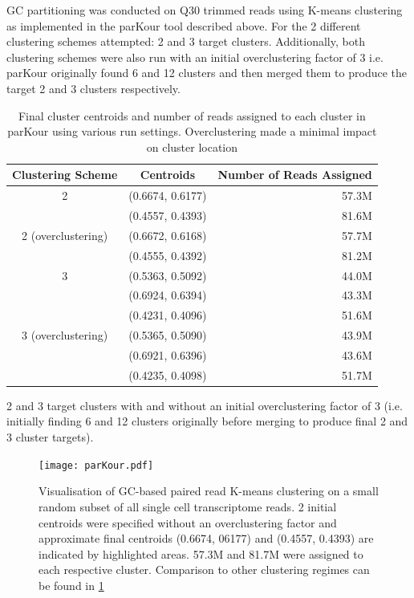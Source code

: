GC partitioning was conducted on Q30 trimmed reads 
using K-means clustering as implemented in the parKour tool described above.
For the 2 different clustering schemes attempted: 2 and 3 target clusters.
Additionally, both clustering schemes were also run with an initial overclustering factor of 3
i.e. parKour originally found 6 and 12 clusters and then merged them to produce the target 2 and 3 
clusters respectively. 

\begin{table}
    \begin{tabular}{ccr}
        \toprule
        Clustering Scheme & Centroids & Number of Reads Assigned \\
        \midrule
        \midrule
        2                    & (0.6674, 0.6177) & 57.3M \\
                             & (0.4557, 0.4393) & 81.6M \\
        \midrule
        2 (overclustering)   & (0.6672, 0.6168) & 57.7M \\
                             & (0.4555, 0.4392) & 81.2M \\
        \midrule
        3                    & (0.5363, 0.5092) & 44.0M \\
                             & (0.6924, 0.6394) & 43.3M \\
                             & (0.4231, 0.4096) & 51.6M \\
        \midrule
        3 (overclustering)   & (0.5365, 0.5090) & 43.9M \\
                             & (0.6921, 0.6396) & 43.6M \\
                             & (0.4235, 0.4098) & 51.7M \\
        \bottomrule
    \end{tabular} 
    \caption{Final cluster centroids and number of reads assigned
    to each cluster in parKour using various run settings.  Overclustering
made a minimal impact on cluster location}
    \label{tab:centroids} 
\end{table} 

2 and 3 target clusters with and without an initial 
overclustering factor of 3 (i.e. initially finding 6 and 12 clusters originally before merging to
produce final 2 and 3 cluster targets). 

\begin{figure}
    \texttt{[image: parKour.pdf]}
    \caption{Visualisation of GC-based paired read K-means clustering on a small random subset of all single cell transcriptome
    reads. 2 initial centroids were specified without an overclustering factor and approximate final centroids (0.6674, 06177) and (0.4557, 0.4393) are indicated by highlighted areas.  57.3M and 81.7M were assigned to each respective cluster. Comparison to other clustering regimes can be found in \ref{tab:centroids}} 
        \label{fig:parkour} 
\end{figure}


